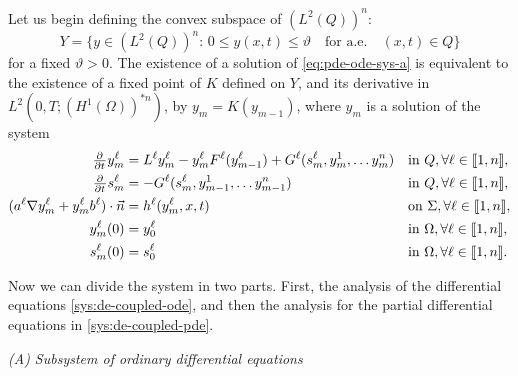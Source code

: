 \documentclass[11pt]{article}
\newcommand{\llb}{\llbracket}
\newcommand{\rrb}{\rrbracket}
\begin{document}
Let us begin defining the convex subspace of \((L^2 (Q))^n\):
\[
	Y = \big\{ y \in	(L^2 (Q))^n:\, 	%
	0 \leq y(x,t) \leq \vartheta \quad\text{for a.e.}\quad (x,t) \in Q \big\}
\]
for a fixed \(\vartheta > 0\).
%
The existence of a solution of \eqref{eq:pde-ode-sys-a} is equivalent to the existence
of a fixed point of \(K\) defined on 
\(Y\),
%
%
%
%
and its derivative in \(L^2 ( 0,T;(H^1(\Omega))^{*n} )\),
by \( y_m = K(y_{m-1}) \), where \(y_m\) is a solution of the system
\begin{subequations}
\label{sys:de-coupled}
\begin{align}
	\pd{ }{t} y_m^\ell &= L^\ell y_m^\ell - y^\ell_m F^\ell(y_{m-1}^\ell) + G^\ell(s_m^\ell,y_{m}^1,\ldots y_{m}^n) 		&& \text{in } Q, \forall \ell \in \llb 1,n\rrb,
	\label{sys:de-coupled-pde}
	\\
	\pd{ }{t} s_m^\ell &= -G^\ell(s_m^\ell,y_{m-1}^1,\ldots y_{m-1}^n)				&& \text{in } Q,\forall \ell \in \llb 1,n\rrb,
	\label{sys:de-coupled-ode}
	\\
	 (a^\ell  \nabla y_m^\ell + y_m^\ell b^\ell) \cdot \vec{n} &= h^\ell (y_{m}^\ell, x,t)	&& \text{on } \Sigma,\forall \ell \in \llb 1,n\rrb,
	 \label{sys:de-coupled-pde-b}
	 \\
	 y_m^\ell(0) &= y^\ell_{0}			 && \text{in } \Omega, \forall \ell \in \llb 1,n\rrb,
	 \label{sys:de-coupled-pde-i}
	 \\
	 s_m^\ell(0) &= s^\ell_{0}			 && \text{in } \Omega, \forall \ell \in \llb 1,n\rrb.
	 \label{sys:de-coupled-ode-i}
\end{align}
\end{subequations}

Now we can divide the system in two parts. First, the analysis of the differential equations \eqref{sys:de-coupled-ode}, and then the analysis for the partial differential equations in \eqref{sys:de-coupled-pde}.

\vspace{1\baselineskip}
\noindent\emph{(A) Subsystem of ordinary differential equations}
\vspace{0.5\baselineskip}
\end{document}
